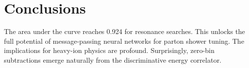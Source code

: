 \section{Conclusions}\label{sec:conclusions}

The area under the curve reaches 0.924 for resonance searches. This
unlocks the full potential of message-passing neural networks for parton
shower tuning. The implications for heavy-ion physics are profound.
Surprisingly, zero-bin subtractions emerge naturally from the
discriminative energy correlator.

